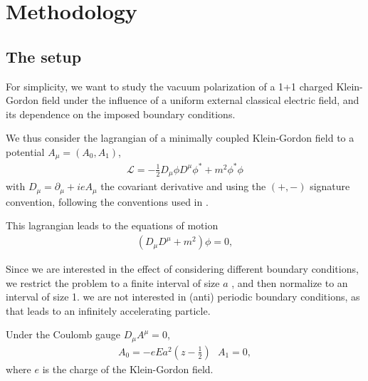 \chapter{Methodology}

\section{The setup}

For simplicity, we want to study the vacuum polarization of a 1+1 charged Klein-Gordon field under the influence of a uniform external classical electric field, and its dependence on the imposed boundary conditions.   

 We thus consider the lagrangian of a minimally coupled Klein-Gordon field to a potential $A_\mu = (A_0, A_1)$,
\begin{align}
	\mathcal{L} = - \frac{1}{2} D_\mu \phi D^\mu \phi^* + m^2 \phi^* \phi
	\label{eq:KG-lagrangian}
\end{align}
with $D_\mu =  \partial_\mu + ie A_\mu $ the covariant derivative and using the $(+, -)$ signature convention, following the conventions used in \cite{Ambjorn1983,Wernersson2020} .

This lagrangian leads to the equations of motion
\begin{align}
	\left( D_\mu D^\mu + m^2 \right)\phi = 0,
	\label{eq:TDKGE}
\end{align}

Since we are interested in the effect of considering different boundary conditions, we restrict the problem to a finite interval of size $a$ , and then normalize to an interval of size 1. \cite{Schlemmer2015} we are not interested in (anti) periodic boundary conditions, as that leads to an infinitely accelerating particle.

Under the Coulomb gauge $D_\mu A^{\mu} = 0$,
\begin{align}
	A_0 = -eEa^2\left(z - \frac{1}{2}\right) \,\,\,\, A_1 = 0,
\end{align}
where $e$ is the charge of the Klein-Gordon field.

